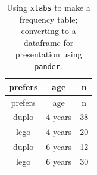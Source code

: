 \documentclass[]{article}
\theoremstyle{definition}
\theoremstyle{definition}
\theoremstyle{definition}
\theoremstyle{remark}
\begin{document}
\begin{longtable}[]{@{}ccc@{}}
\caption{Using \texttt{xtabs} to make a frequency table; converting to a
dataframe for presentation using \texttt{pander}.}\tabularnewline
\toprule
\begin{minipage}[b]{0.13\columnwidth}\centering\strut
prefers\strut
\end{minipage} & \begin{minipage}[b]{0.13\columnwidth}\centering\strut
age\strut
\end{minipage} & \begin{minipage}[b]{0.05\columnwidth}\centering\strut
n\strut
\end{minipage}\tabularnewline
\midrule
\endfirsthead
\toprule
\begin{minipage}[b]{0.13\columnwidth}\centering\strut
prefers\strut
\end{minipage} & \begin{minipage}[b]{0.13\columnwidth}\centering\strut
age\strut
\end{minipage} & \begin{minipage}[b]{0.05\columnwidth}\centering\strut
n\strut
\end{minipage}\tabularnewline
\midrule
\endhead
\begin{minipage}[t]{0.13\columnwidth}\centering\strut
duplo\strut
\end{minipage} & \begin{minipage}[t]{0.13\columnwidth}\centering\strut
4 years\strut
\end{minipage} & \begin{minipage}[t]{0.05\columnwidth}\centering\strut
38\strut
\end{minipage}\tabularnewline
\begin{minipage}[t]{0.13\columnwidth}\centering\strut
lego\strut
\end{minipage} & \begin{minipage}[t]{0.13\columnwidth}\centering\strut
4 years\strut
\end{minipage} & \begin{minipage}[t]{0.05\columnwidth}\centering\strut
20\strut
\end{minipage}\tabularnewline
\begin{minipage}[t]{0.13\columnwidth}\centering\strut
duplo\strut
\end{minipage} & \begin{minipage}[t]{0.13\columnwidth}\centering\strut
6 years\strut
\end{minipage} & \begin{minipage}[t]{0.05\columnwidth}\centering\strut
12\strut
\end{minipage}\tabularnewline
\begin{minipage}[t]{0.13\columnwidth}\centering\strut
lego\strut
\end{minipage} & \begin{minipage}[t]{0.13\columnwidth}\centering\strut
6 years\strut
\end{minipage} & \begin{minipage}[t]{0.05\columnwidth}\centering\strut
30\strut
\end{minipage}\tabularnewline
\bottomrule
\end{longtable}
\end{document}
